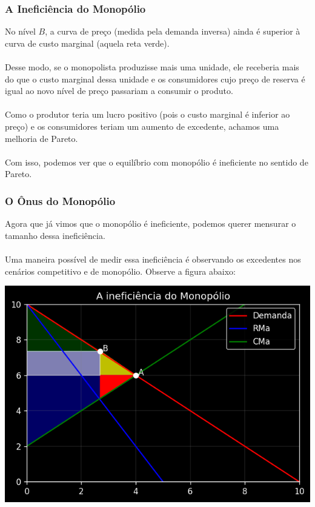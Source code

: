 \documentclass{beamer}[10]
\begin{document}
\begin{frame}
	\frametitle{A Ineficiência do Monopólio}
	
	No nível $B$, a curva de preço (medida pela demanda inversa) ainda é superior à curva de custo marginal (aquela reta verde).
	\\~\\
	Desse modo, se o monopolista produzisse mais uma unidade, ele receberia mais do que o custo marginal dessa unidade e os consumidores cujo preço de reserva é igual ao novo nível de preço passariam a consumir o produto.
	\\~\\
	Como o produtor teria um lucro positivo (pois o custo marginal é inferior ao preço) e os consumidores teriam um aumento de excedente, achamos uma melhoria de Pareto.
	\\~\\
	Com isso, podemos ver que o equilíbrio com monopólio é ineficiente no sentido de Pareto.
\end{frame}


\begin{frame}
	\frametitle{O Ônus do Monopólio}
	
	Agora que já vimos que o monopólio é ineficiente, podemos querer mensurar o tamanho dessa ineficiência.
	\\~\\
	Uma maneira possível de medir essa ineficiência é observando os excedentes nos cenários competitivo e de monopólio. Observe a figura abaixo:
	
	\begin{center}
		\includegraphics[scale=0.5]{cap25_5-onus_monopolio.png}
		\end{center}
\end{frame}
\end{document}
